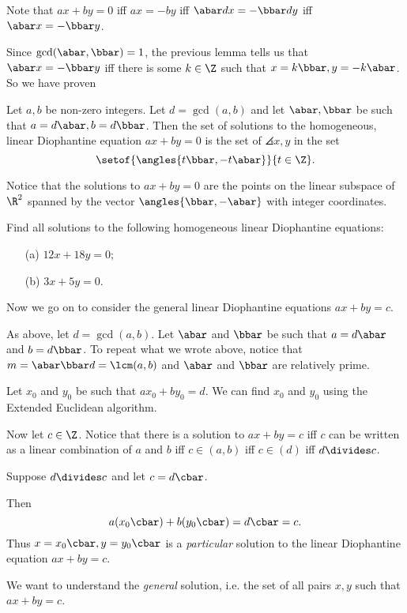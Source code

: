 \documentclass[oneside,12pt]{amsart}
\begin{document}
Note that $ax+by=0$ iff $ax=-by$ iff $\abar d x = - \bbar d y$ iff $\abar x = -\bbar y$.

Since $\gcd(\abar,\bbar)=1$, the previous lemma tells us that $\abar x = -\bbar y$ 
iff there is some $k\in\Z$ such that
$x=k\bbar,y=-k\abar$. So we have proven

\begin{lemma}
Let $a,b$ be non-zero integers. Let $d=\gcd(a,b)$ and let $\abar,\bbar$ be such that
$a=d\abar, b=d\bbar$. Then the set of solutions to the
homogeneous, linear Diophantine equation $ax+by=0$ is the set of $\angles{x,y}$ in the set
$$\setof{\angles{t\bbar,-t\abar}}{t\in\Z}.$$
\end{lemma}

Notice that the solutions to $ax+by=0$ are the points on the linear subspace of $\R^2$ spanned
by the vector $\angles{\bbar,-\abar}$ with integer coordinates.

\begin{in_class_example}
Find all solutions to the following homogeneous linear Diophantine equations:
\begin{itemize}
\item[(a)] $12x + 18y = 0$;
\item[(b)] $3x + 5y = 0$.
\end{itemize}
\end{in_class_example}


Now we go on to consider the general linear Diophantine equations $ax+by=c$.

As above, let $d=\gcd(a,b)$.  Let $\abar$ and $\bbar$ be such that $a=d\abar$ and $b=d\bbar$.
To repeat what we wrote above, notice that $m=\abar \bbar d = \lcm(a,b)$
and $\abar$ and $\bbar$ are relatively prime. 

Let $x_0$ and $y_0$ be such that $ax_0 + b y_0 = d$. We can find $x_0$ and $y_0$ using
the Extended Euclidean algorithm.

Now let $c\in \Z$. Notice that there is a solution to $ax+by=c$ iff $c$ can be written as a linear combination of $a$ and $b$
iff $c\in(a,b)$ iff $c\in(d)$ iff $d\divides c$. 



Suppose $d\divides c$ and let $c=d\cbar$. 


Then
$$ a (x_0 \cbar) +  b (y_0 \cbar)=  d \cbar = c.$$
Thus $x= x_0 \cbar, y=y_0 \cbar $ is a \emph{particular} solution to the linear Diophantine equation $ax+by=c$.



We want to understand the \emph{general} solution, i.e. the set of all pairs $x,y$ such that $ax+by=c$.
\end{document}
